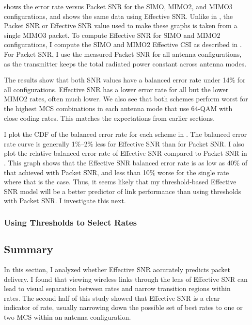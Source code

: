  shows the error rate versus Packet SNR for the SIMO, MIMO2, and MIMO3 configurations, and  shows the same data using Effective SNR. Unlike in , the Packet SNR or Effective SNR value used to make these graphs is taken from a single MIMO3 packet. To compute Effective SNR for SIMO and MIMO2 configurations, I compute the SIMO and MIMO2 Effective CSI as described in . For Packet SNR, I use the measured Packet SNR for all antenna configurations, as the transmitter keeps the total radiated power constant across antenna modes.

The results show that both SNR values have a balanced error rate under 14\% for all configurations. Effective SNR has a lower error rate for all but the lower MIMO2 rates, often much lower. We also see that both schemes perform worst for the highest MCS combinations in each antenna mode that use 64-QAM with close coding rates. This matches the expectations from earlier sections.

I plot the CDF of the balanced error rate for each scheme in . The balanced error rate curve is generally 1\%--2\% less for Effective SNR than for Packet SNR. I also plot the relative balanced error rate of Effective SNR compared to Packet SNR in . This graph shows that the Effective SNR balanced error rate is as low as 40\% of that achieved with Packet SNR, and less than 10\% worse for the single rate where that is the case. Thus, it seems likely that my threshold-based Effective SNR model will be a better predictor of link performance than using thresholds with Packet SNR. I investigate this next.

\subsubsection{Using Thresholds to Select Rates}

\subsection{Summary}
In this section, I analyzed whether Effective SNR accurately predicts packet delivery. I found that viewing wireless links through the lens of Effective SNR can lead to visual separation between rates and narrow transition regions within rates. The second half of this study showed that Effective SNR is a clear indicator of rate, usually narrowing down the possible set of best rates to one or two MCS within an antenna configuration.


